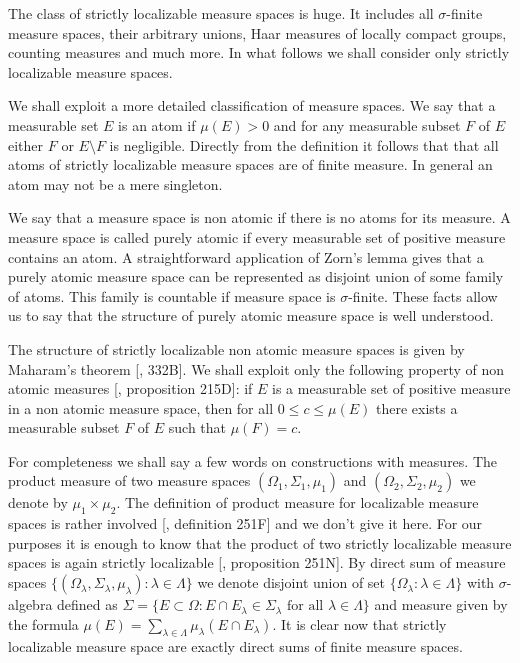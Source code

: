   The class of strictly localizable measure spaces is huge. It includes all $\sigma$-finite measure spaces, their arbitrary unions, Haar measures of locally compact groups, counting measures and much more. In what follows we shall consider only strictly localizable measure spaces.

We shall exploit a more detailed classification of measure spaces. We say that a measurable set $E$ is an atom if $\mu(E)>0$ and for any measurable subset $F$ of $E$ either $F$ or $E\setminus F$ is negligible. Directly from the definition it follows that that all atoms of strictly localizable measure spaces are of finite measure. In general an atom may not be a mere singleton.

We say that a measure space is non atomic if there is no atoms for its measure. A measure space is called purely atomic if every measurable set of positive measure contains an atom. A straightforward application of Zorn's lemma gives that a purely atomic measure space can be represented as disjoint union of some family of atoms. This family is countable if measure space is $\sigma$-finite. These facts allow us to say that the structure of purely atomic measure space is well understood. 

The structure of strictly localizable non atomic measure spaces is given by Maharam's theorem [\cite{FremMeasTh}, 332B]. We shall exploit only the following property of non atomic measures [\cite{FremMeasTh}, proposition 215D]: if $E$ is a measurable set of positive measure in a non atomic measure space, then for all $0\leq c\leq \mu(E)$ there exists a measurable subset $F$ of $E$ such that $\mu(F)=c$.

For completeness we shall say a few words on constructions with measures. The product measure of two measure spaces $(\Omega_1,\Sigma_1,\mu_1)$ and $(\Omega_2,\Sigma_2,\mu_2)$ we denote by $\mu_1\times \mu_2$. The definition of product measure for localizable measure spaces is rather involved [\cite{FremMeasTh}, definition 251F] and we don't give it here.  For our purposes it is enough to know that the product of two strictly localizable measure spaces is again strictly localizable [\cite{FremMeasTh}, proposition 251N]. By direct sum of measure spaces $\{(\Omega_\lambda, \Sigma_\lambda, \mu_\lambda):\lambda\in\Lambda\}$ we denote disjoint union of set $\{\Omega_\lambda:\lambda\in\Lambda\}$ with $\sigma$-algebra defined as $\Sigma=\{E\subset \Omega: E\cap E_\lambda\in\Sigma_\lambda\mbox{ for all }\lambda\in\Lambda\}$ and measure given by the formula $\mu(E)=\sum_{\lambda\in\Lambda}\mu_\lambda(E\cap E_\lambda)$. It is clear now that strictly localizable measure space are exactly direct sums of finite measure spaces.

